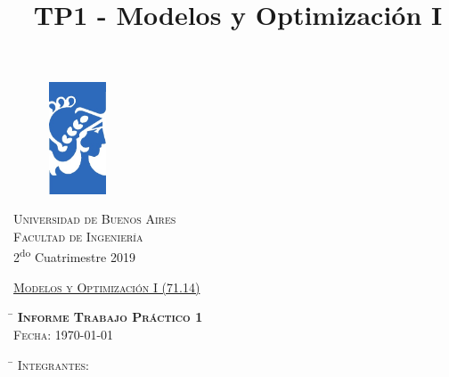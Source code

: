 \documentclass[a4paper]{article}
\begin{document}
\thispagestyle{empty}
\title{TP1 - Modelos y Optimización I}

		\begin{figure}[H]
	\centering
    \includegraphics[width=0.15\textwidth]{logo.jpg}
   \end{figure}


	\begin{center}
		\huge{\textsc{Universidad de Buenos Aires}}\\
		\huge{\textsc{Facultad de Ingeniería}}\\
		\vspace*{3mm}
		\large{ 2\textsuperscript{do} Cuatrimestre 2019}
	\end{center}

	\vspace*{20mm}

	\begin{center}
		\huge{\underline{\textsc{Modelos y Optimización I (71.14)}}}\\
	\end{center}



	\begin{large}

	\begin{tabbing}
		\hspace{34mm} \= \+
		\textsc{\bf{\Large{Informe Trabajo Práctico 1}}}\\
		\textsc{Fecha:} {\today}\\
	\end{tabbing}

\vspace{20mm}

    \begin{tabbing}
    	\hspace{20mm} \= \+
        \textsc{Integrantes:}\\
    \end{tabbing}

	\end{large}

\vspace{-7mm}
\end{document}
